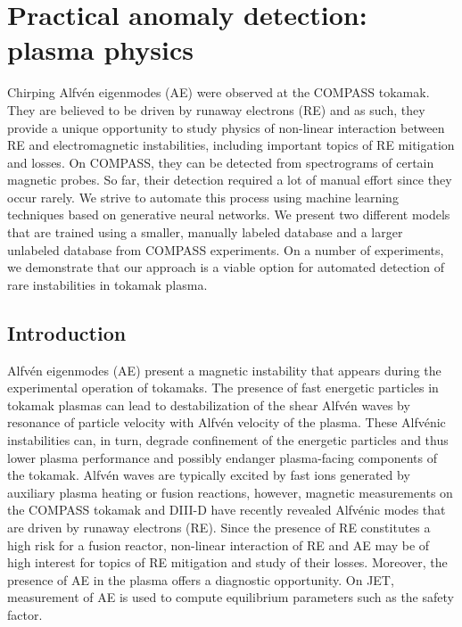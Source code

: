 \chapter{Practical anomaly detection: plasma physics}

Chirping Alfv\'en eigenmodes (AE) were observed at the COMPASS tokamak. They are believed to be driven by runaway electrons (RE) and as such, they provide a unique opportunity to study physics of non-linear interaction between RE and electromagnetic instabilities, including important topics of RE mitigation and losses. On COMPASS, they can be detected from spectrograms of certain magnetic probes. So far, their detection required a lot of manual effort since they occur rarely. We strive to automate this process using machine learning techniques based on generative neural networks. We present two different models that are trained using a smaller, manually labeled database and a larger unlabeled database from COMPASS experiments. On a number of experiments, we demonstrate that our approach is a viable option for automated detection of rare instabilities in tokamak plasma.

\section{Introduction}

Alfv\'en eigenmodes (AE) present a magnetic instability that appears during the experimental operation of tokamaks. The presence of fast energetic particles in tokamak plasmas can lead to destabilization of the shear Alfv\'en waves by resonance of particle velocity with Alfv\'en velocity of the plasma. These Alfv\'enic instabilities can, in turn, degrade confinement of the energetic particles and thus lower plasma performance and possibly endanger plasma-facing components of the tokamak\cite{mett1992kinetic}. Alfv\'en waves are typically excited by fast ions generated by auxiliary plasma heating or fusion reactions, however, magnetic measurements on the COMPASS tokamak\cite{markovic2017alfven} and DIII-D\cite{lvovskiy2019observation} have recently revealed Alfv\'enic modes that are driven by runaway electrons (RE). Since the presence of RE constitutes a high risk for a fusion reactor, non-linear interaction of RE and AE may be of high interest for topics of RE mitigation and study of their losses. Moreover, the presence of AE in the plasma offers a diagnostic opportunity. On JET, measurement of AE is used to compute equilibrium parameters such as the safety factor\cite{sharapov2001mhd}.

